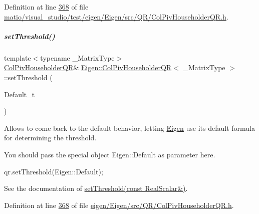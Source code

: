 Definition at line \hyperlink{matio_2visual__studio_2test_2eigen_2_eigen_2src_2_q_r_2_col_piv_householder_q_r_8h_source_l00368}{368} of file \hyperlink{matio_2visual__studio_2test_2eigen_2_eigen_2src_2_q_r_2_col_piv_householder_q_r_8h_source}{matio/visual\+\_\+studio/test/eigen/\+Eigen/src/\+Q\+R/\+Col\+Piv\+Householder\+Q\+R.\+h}.

\mbox{\label{group___q_r___module_a648df14c457ceceb09d933d06d3bdded}} 
\subparagraph{\texorpdfstring{set\+Threshold()}{setThreshold()}\hspace{0.1cm}{\footnotesize\ttfamily [4/4]}}
{\footnotesize\ttfamily template$<$typename \+\_\+\+Matrix\+Type$>$ \\
\hyperlink{group___q_r___module_class_eigen_1_1_col_piv_householder_q_r}{Col\+Piv\+Householder\+QR}\& \hyperlink{group___q_r___module_class_eigen_1_1_col_piv_householder_q_r}{Eigen\+::\+Col\+Piv\+Householder\+QR}$<$ \+\_\+\+Matrix\+Type $>$\+::set\+Threshold (\begin{DoxyParamCaption}\item[{Default\+\_\+t}]{ }\end{DoxyParamCaption})\hspace{0.3cm}{\ttfamily [inline]}}

Allows to come back to the default behavior, letting \hyperlink{namespace_eigen}{Eigen} use its default formula for determining the threshold.

You should pass the special object Eigen\+::\+Default as parameter here. 
\begin{DoxyCode}
qr.setThreshold(Eigen::Default); 
\end{DoxyCode}


See the documentation of \hyperlink{group___q_r___module_ae712cdc9f0e521cfc8061bee58ff55ee}{set\+Threshold(const Real\+Scalar\&)}. 

Definition at line \hyperlink{eigen_2_eigen_2src_2_q_r_2_col_piv_householder_q_r_8h_source_l00368}{368} of file \hyperlink{eigen_2_eigen_2src_2_q_r_2_col_piv_householder_q_r_8h_source}{eigen/\+Eigen/src/\+Q\+R/\+Col\+Piv\+Householder\+Q\+R.\+h}.


